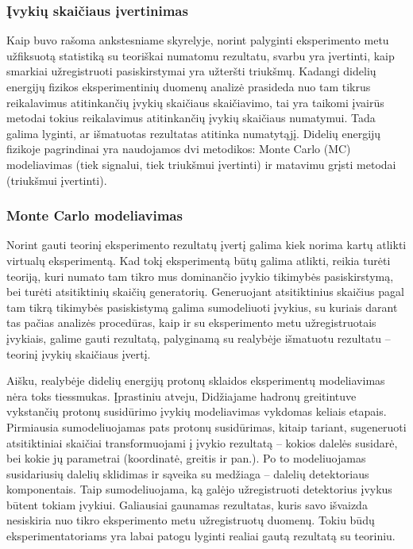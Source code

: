 \documentclass[a4paper, 12pt]{article}
\begin{document}
\subsubsection{Įvykių skaičiaus įvertinimas} \label{sec:estimation}

Kaip buvo rašoma ankstesniame skyrelyje, norint palyginti eksperimento metu užfiksuotą
statistiką su teoriškai numatomu rezultatu, svarbu yra įvertinti, kaip smarkiai užregistruoti
pasiskirstymai yra užteršti triukšmų.
Kadangi didelių energijų fizikos eksperimentinių duomenų analizė prasideda nuo tam tikrus
reikalavimus atitinkančių įvykių skaičiaus skaičiavimo, tai yra taikomi įvairūs metodai
tokius reikalavimus atitinkančių įvykių skaičiaus numatymui.
Tada galima lyginti, ar išmatuotas rezultatas atitinka numatytąjį.
Didelių energijų fizikoje pagrindinai yra naudojamos dvi metodikos: Monte Carlo (MC) modeliavimas
(tiek signalui, tiek triukšmui įvertinti) ir matavimu grįsti metodai (triukšmui įvertinti).

\subsubsection*{Monte Carlo modeliavimas}

Norint gauti teorinį eksperimento rezultatų įvertį galima kiek norima kartų atlikti virtualų
eksperimentą.
Kad tokį eksperimentą būtų galima atlikti, reikia turėti teoriją, kuri numato tam tikro mus
dominančio įvykio tikimybės pasiskirstymą, bei turėti atsitiktinių skaičių generatorių.
Generuojant atsitiktinius skaičius pagal tam tikrą tikimybės pasiskistymą galima sumodeliuoti
įvykius, su kuriais darant tas pačias analizės procedūras, kaip ir su eksperimento metu
užregistruotais įvykiais, galime gauti rezultatą, palyginamą su realybėje išmatuotu
rezultatu -- teorinį įvykių skaičiaus įvertį.

Aišku, realybėje didelių energijų protonų sklaidos eksperimentų modeliavimas nėra toks
tiessmukas.
Įprastiniu atveju, Didžiajame hadronų greitintuve vykstančių protonų susidūrimo įvykių
modeliavimas vykdomas keliais etapais.
Pirmiausia sumodeliuojamas pats protonų susidūrimas, kitaip tariant, sugeneruoti
atsitiktiniai skaičiai transformuojami į įvykio rezultatą -- kokios dalelės susidarė, bei
kokie jų parametrai (koordinatė, greitis ir pan.).
Po to modeliuojamas susidariusių dalelių sklidimas ir sąveika su medžiaga -- dalelių
detektoriaus komponentais.
Taip sumodeliuojama, ką galėjo užregistruoti detektorius įvykus būtent tokiam įvykiui.
Galiausiai gaunamas rezultatas, kuris savo išvaizda nesiskiria nuo tikro eksperimento metu
užregistruotų duomenų.
Tokiu būdų eksperimentatoriams yra labai patogu lyginti realiai gautą rezultatą su teoriniu.
\end{document}

